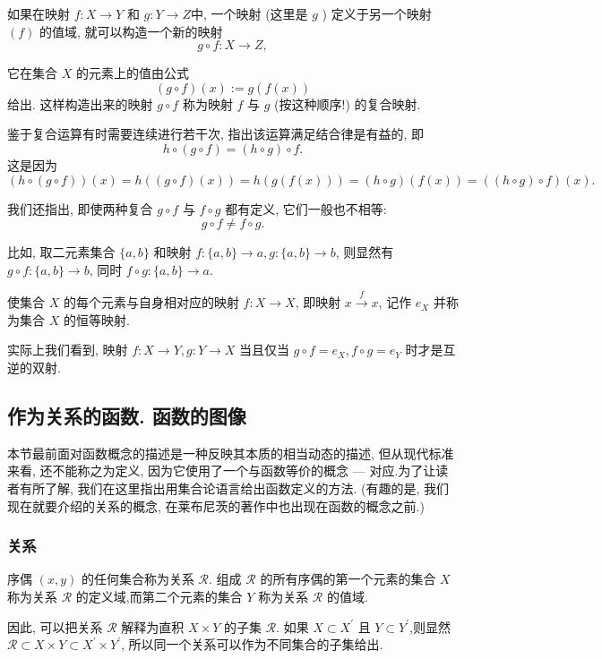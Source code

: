 \documentclass{ctexart}
\begin{document}
如果在映射 $f: X \rightarrow Y$ 和 $g: Y \rightarrow Z$中, 一个映射 (这里是 $g$ ) 定义于另一个映射 $(f)$ 的值域, 就可以构造一个新的映射
$$
g \circ f: X \rightarrow Z,
$$

它在集合 $X$ 的元素上的值由公式
$$
(g \circ f)(x):=g(f(x))
$$
给出. 这样构造出来的映射 $g \circ f$ 称为映射 $f$ 与 $g$ (按这种顺序!) 的复合映射.

鉴于复合运算有时需要连续进行若干次, 指出该运算满足结合律是有益的, 即
$$
h \circ(g \circ f)=(h \circ g) \circ f .
$$
这是因为
\[
    (h \circ(g \circ f))(x)=h((g \circ f)(x))=h(g(f(x)))=(h \circ g)(f(x))=((h \circ g) \circ f)(x).
\]

我们还指出, 即使两种复合 $g \circ f$ 与 $f \circ g$ 都有定义, 它们一般也不相等:
$$
g \circ f \neq f \circ g .
$$

比如, 取二元素集合 $\{a, b\}$ 和映射 $f:\{a, b\} \rightarrow a, g:\{a, b\} \rightarrow b$, 则显然有 $g \circ f:\{a, b\} \rightarrow b$, 同时 $f \circ g:\{a, b\} \rightarrow a$.

使集合 $X$ 的每个元素与自身相对应的映射 $f: X \rightarrow X$, 即映射 $x \stackrel{f}{\longrightarrow} x$, 记作 $e_X$ 并称为集合 $X$ 的恒等映射.

实际上我们看到, 映射 $f: X \rightarrow Y, g: Y \rightarrow X$ 当且仅当 $g \circ f=e_X, f \circ g=e_Y$ 时才是互逆的双射. 

\subsection{作为关系的函数. 函数的图像} 本节最前面对函数概念的描述是一种反映其本质的相当动态的描述, 但从现代标准来看, 还不能称之为定义, 因为它使用了一个与函数等价的概念 --- 对应.为了让读者有所了解, 我们在这里指出用集合论语言给出函数定义的方法. (有趣的是, 我们现在就要介绍的关系的概念, 在莱布尼茨的著作中也出现在函数的概念之前.)

\subsubsection{关系} 

序偶 $(x, y)$ 的任何集合称为关系 $\mathcal{R}$. 组成 $\mathcal{R}$ 的所有序偶的第一个元素的集合 $X$ 称为关系 $\mathcal{R}$ 的定义域,而第二个元素的集合 $Y$ 称为关系 $\mathcal{R}$ 的值域.

因此, 可以把关系 $\mathcal{R}$ 解释为直积 $X \times Y$ 的子集 $\mathcal{R}$. 如果 $X \subset X^{\prime}$ 且 $Y \subset Y^{\prime}$,则显然 $\mathcal{R} \subset X \times Y \subset X^{\prime} \times Y^{\prime}$, 所以同一个关系可以作为不同集合的子集给出.
\end{document}
